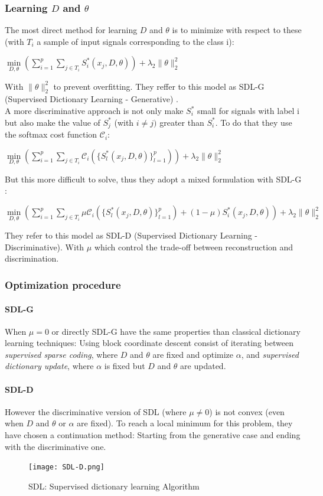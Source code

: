 \documentclass[a4paper,10pt]{article}
\begin{document}
\subsubsection{Learning $D$ and $\theta$}
The most direct method for learning $D$ and $\theta$ is to minimize with respect to these (with $T_i$ a sample of input signals corresponding to the class i):
\begin{center}
 $\underset{D,\theta}{\min}(\sum_{i=1}^p \sum_{j \in T_i}S^*_i(x_j,D,\theta))+ \lambda_2 \|\theta\|^2_2$
\end{center}
With  $ \|\theta\|^2_2$ to prevent overfitting. They reffer to this model as SDL-G (Supervised Dictionary Learning - Generative) \cite{mairal:inria-00322431}.\\
A more discriminative approach is not only make $S^*_i$ small for signals with label i but also make the value of $S^*_j$ (with $i \neq j)$ greater than $S^*_i$. To do that they use the softmax cost function $\mathcal{C}_i$:
\begin{center}
  $\underset{D,\theta}{\min}(\sum_{i=1}^p \sum_{j \in T_i} \mathcal{C}_i(\{ S^*_l(x_j,D,\theta)\}^{p}_{l=1}))+ \lambda_2 \|\theta\|^2_2$
\end{center}
But this more difficult to solve, thus they adopt a mixed formulation with SDL-G :
\begin{center}
   $\underset{D,\theta}{\min}(\sum_{i=1}^p \sum_{j \in T_i} \mu \mathcal{C}_i(\{ S^*_l(x_j,D,\theta)\}^{p}_{l=1}) + (1-\mu)S^*_i(x_j,D,\theta))+ \lambda_2 \|\theta\|^2_2$
\end{center}
They refer to this model as SDL-D (Supervised Dictionary Learning - Discriminative). With $\mu$ which control the trade-off between reconstruction and discrimination.

\subsubsection{Optimization  procedure}
\paragraph{SDL-G}
When $\mu = 0$ or directly SDL-G have the same properties than classical dictionary learning techniques: Using block coordinate descent  consist of iterating between \textit{supervised sparse coding}, where $D$ and $\theta$ are fixed and optimize $\alpha$, and \textit{supervised dictionary update}, where  $\alpha$ is fixed but $D$ and $\theta$ are updated.
\paragraph{SDL-D} However the discriminative version of SDL (where $\mu \neq 0$) is not convex (even when $D$ and $\theta$ or $\alpha$ are fixed). To reach a local minimum for this problem, they have chosen a continuation method: Starting from the generative case and ending with the discriminative one.
\begin{figure}[h]
 \centering
 \texttt{[image: SDL-D.png]}
 \caption{SDL: Supervised dictionary learning Algorithm  \cite{mairal:inria-00322431}}
\end{figure}
\end{document}
